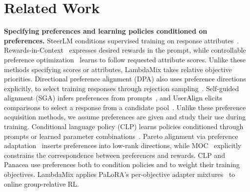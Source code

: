 \documentclass{article} %
\begin{document}
\section{Related Work}
\label{sec:related}

\textbf{Specifying preferences and learning policies conditioned on preferences.} SteerLM conditions supervised training on response attributes~\citep{dong2023steerlm}. Rewards-in-Context~\citep[RiC]{yang2024ric} expresses desired rewards in the prompt, while controllable preference optimization~\citep[CPO]{guo2024cpo} learns to follow requested attribute scores. Unlike these methods specifying scores or attributes, LambdaMix takes relative objective priorities. Directional preference alignment (DPA) also uses preference directions explicitly, to select training responses through rejection sampling~\citep{wang-etal-2024-arithmetic}. Self-guided alignment (SGA) infers preferences from prompts~\citep{wang2026sga}, and UserAlign elicits comparisons to select a response from a candidate pool~\citep{padurean2025useralign}. Unlike these preference acquisition methods, we assume preferences are given and study their use during training. Conditional language policy (CLP) learns policies conditioned through prompts or learned parameter combinations~\citep{wang-etal-2024-conditional}. Pareto alignment via preference adaptation~\citep[Panacea]{zhong2024panacea} inserts preferences into low-rank directions, while MOC~\citep{moc2026} explicitly constrains the correspondence between preferences and rewards. CLP and Panacea use preferences both to condition policies and to weight their training objectives. LambdaMix applies PaLoRA's per-objective adapter mixtures~\citep{dimitriadis2025palora} to online group-relative RL.
\end{document}
